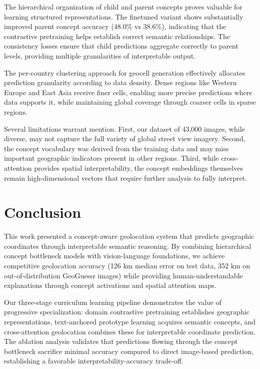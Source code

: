 \documentclass{uva-inf-article}
\begin{document}
The hierarchical organization of child and parent concepts proves valuable for learning structured representations. The finetuned variant shows substantially improved parent concept accuracy (48.0\% vs 38.6\%), indicating that the contrastive pretraining helps establish correct semantic relationships. The consistency losses ensure that child predictions aggregate correctly to parent levels, providing multiple granularities of interpretable output.

The per-country clustering approach for geocell generation effectively allocates prediction granularity according to data density. Dense regions like Western Europe and East Asia receive finer cells, enabling more precise predictions where data supports it, while maintaining global coverage through coarser cells in sparse regions.

Several limitations warrant mention. First, our dataset of 43,000 images, while diverse, may not capture the full variety of global street view imagery. Second, the concept vocabulary was derived from the training data and may miss important geographic indicators present in other regions. Third, while cross-attention provides spatial interpretability, the concept embeddings themselves remain high-dimensional vectors that require further analysis to fully interpret.


\section{Conclusion}
\label{sec:conclusion}

This work presented a concept-aware geolocation system that predicts geographic coordinates through interpretable semantic reasoning. By combining hierarchical concept bottleneck models with vision-language foundations, we achieve competitive geolocation accuracy (126 km median error on test data, 352 km on out-of-distribution GeoGuessr images) while providing human-understandable explanations through concept activations and spatial attention maps.

Our three-stage curriculum learning pipeline demonstrates the value of progressive specialization: domain contrastive pretraining establishes geographic representations, text-anchored prototype learning acquires semantic concepts, and cross-attention geolocation combines these for interpretable coordinate prediction. The ablation analysis validates that predictions flowing through the concept bottleneck sacrifice minimal accuracy compared to direct image-based prediction, establishing a favorable interpretability-accuracy trade-off.
\end{document}
